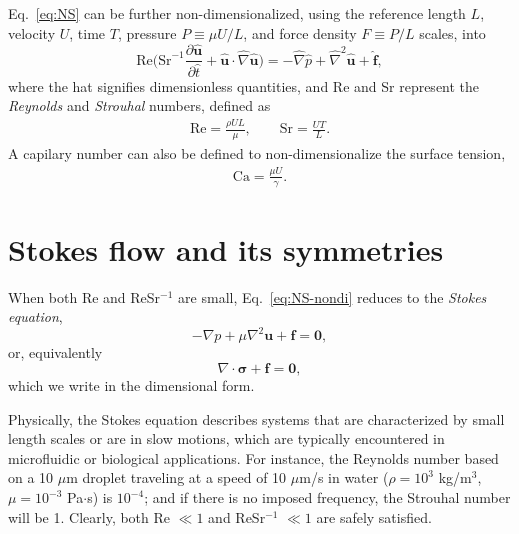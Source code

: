 Eq.\ \eqref{eq:NS} can be further non-dimensionalized, using the reference length $L$, velocity $U$, time $T$, pressure $P \equiv \mu U/L$, and force density $F \equiv P/L$ scales, into
\begin{equation}
   \textrm{Re} \bigg(\textrm{Sr}^{-1} \frac{\partial \hat{\bm u}}{\partial \hat{t}} + \hat{\bm u} \cdot \hat{\nabla} \hat{\bm u} \bigg) =
   -\hat{\nabla} \hat{p} + \hat{\nabla} ^2  \hat{\bm u} + \hat{\bm f},
  \label{eq:NS-nondi}
\end{equation}
where the hat signifies dimensionless quantities, and Re and Sr represent the \emph{Reynolds} and \emph{Strouhal} numbers, defined as
\begin{equation}
  \begin{aligned}
    \textrm{Re} = \frac{\rho UL}{\mu},\quad \quad \textrm{Sr} = \frac{UT}{L}.
  \end{aligned}
\end{equation}
A capilary number can also be defined to non-dimensionalize the surface tension,
\begin{equation}
  \begin{aligned}
    \textrm{Ca} = \frac{\mu U}{\gamma}.
  \end{aligned}
\end{equation}




\section{Stokes flow and its symmetries}
\label{sec:stokes-flows}

When both Re and ReSr$^{-1}$ are small, Eq.\ \eqref{eq:NS-nondi} reduces to the \emph{Stokes equation},
\begin{equation}
   -\nabla p + \mu \nabla ^2  {\bm u} + {\bm f} = {\bm 0},
 \label{eq:Stokes}
\end{equation}
or, equivalently
\begin{equation}
   \nabla \cdot  {\bm \sigma} + {\bm f} = {\bm 0},
 \label{eq:Stokes1}
\end{equation}
which we write in the dimensional form.

Physically, the Stokes equation describes systems that are characterized by small length scales or are in slow motions, which are typically encountered in microfluidic or biological applications.
For instance, the Reynolds number based on a 10 $\mu$m droplet traveling at a speed of 10 $\mu$m/s in water ($\rho=10^3$ kg/m$^{3}$, $\mu=10^{-3}$ Pa$\cdot$s) is $10^{-4}$;
and if there is no imposed frequency, the Strouhal number will be 1.
Clearly, both Re $\ll 1$ and ReSr$^{-1}$ $\ll 1$ are safely satisfied.


